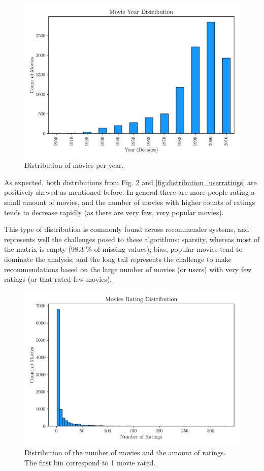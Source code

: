 \documentclass[conference]{IEEEtran}
\begin{document}
\begin{figure}[H]
    \centering
    \includegraphics[width=1\linewidth]{assets/year_distribution.png}
    \caption{Distribution of movies per year.}
    \label{fig:year_distribution}
\end{figure}

As expected, both distributions from Fig. \ref{fig:distribution_moviesratings} and \ref{fig:distribution_userratings} are positively skewed as mentioned before. In general there are more people rating a small amount of movies, and the number of movies with higher counts of ratings tends to decrease rapidly (as there are very few, very popular movies).

This type of distribution is commonly found across recommender systems, and represents well the challenges posed to these algorithms: sparsity, whereas most of the matrix is empty (98.3 \% of missing values); bias, popular movies tend to dominate the analysis; and the long tail represents the challenge to make recommendations based on the large number of movies (or users) with very few ratings (or that rated few movies).

\begin{figure}[H]
    \centering
    \includegraphics[width=1\linewidth]{assets/distribution_moviesratings.png}
    \caption{Distribution of the number of movies and the amount of ratings. The first bin correspond to 1 movie rated.}    \label{fig:distribution_moviesratings}
\end{figure}
\end{document}
